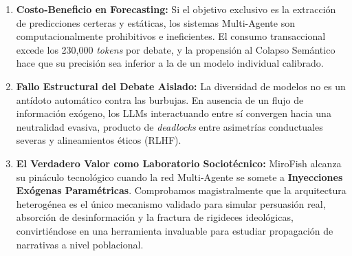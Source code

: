 \documentclass{article}
\begin{document}
\begin{enumerate}
    \item \textbf{Costo-Beneficio en Forecasting:} Si el objetivo exclusivo es la extracción de predicciones certeras y estáticas, los sistemas Multi-Agente son computacionalmente prohibitivos e ineficientes. El consumo transaccional excede los 230,000 \textit{tokens} por debate, y la propensión al Colapso Semántico hace que su precisión sea inferior a la de un modelo individual calibrado.
    \item \textbf{Fallo Estructural del Debate Aislado:} La diversidad de modelos no es un antídoto automático contra las burbujas. En ausencia de un flujo de información exógeno, los LLMs interactuando entre sí convergen hacia una neutralidad evasiva, producto de \textit{deadlocks} entre asimetrías conductuales severas y alineamientos éticos (RLHF).
    \item \textbf{El Verdadero Valor como Laboratorio Sociotécnico:} MiroFish alcanza su pináculo tecnológico cuando la red Multi-Agente se somete a \textbf{Inyecciones Exógenas Paramétricas}. Comprobamos magistralmente que la arquitectura heterogénea es el único mecanismo validado para simular persuasión real, absorción de desinformación y la fractura de rigideces ideológicas, convirtiéndose en una herramienta invaluable para estudiar propagación de narrativas a nivel poblacional.
\end{enumerate}
\end{document}
